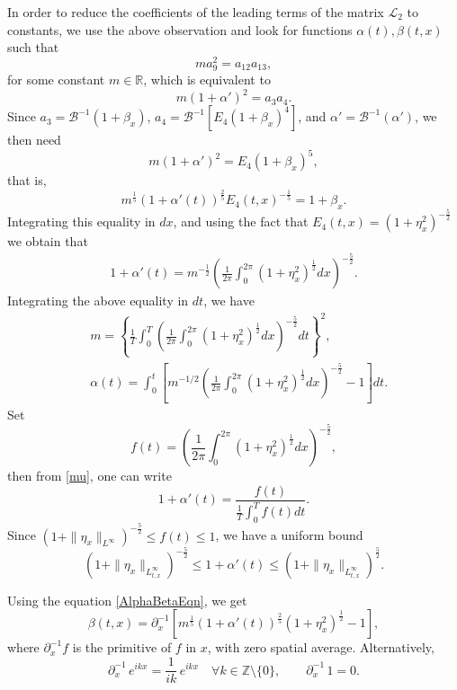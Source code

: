 \documentclass[12pt]{amsart}
\theoremstyle{remark}
\theoremstyle{definition}
\numberwithin{equation}{section}
\newcommand{\p}{\partial}
\newcommand{\R}{\mathbb{R}}
\newcommand{\Z}{\mathbb{Z}}
\newcommand{\al}{\alpha}
\newcommand{\f}{\frac}
\newcommand{\mB}{\mathcal{B}}
\newcommand{\mL}{\mathcal{L}}
\renewcommand{\a}{\alpha}
\newcommand{\inv}{^{-1}}
\begin{document}
In order to reduce the coefficients of the leading terms of the matrix $\mL_2$ to constants, we use the above observation and look for functions $\al(t),\beta(t, x)$ such that
\begin{equation*}
m a^2_9=a_{12}a_{13},
\end{equation*}
for some constant $m\in\R$, which is equivalent to
\begin{equation*}
m(1+\al')^2=a_{3}a_{4}.
\end{equation*}
Since $a_3=\mB\inv(1+\beta_x)$, $a_4=\mB\inv[E_4(1+\beta_x)^4]$, and $\al'=\mathcal{B}^{-1}(\al')$, we then need
\begin{equation*}
m(1+\al')^2=E_4(1+\beta_x)^5,
\end{equation*}
that is, 
\begin{equation} \label{AlphaBetaEqn}
m^{\f15}(1+\al'(t))^{\f25}E_4(t,x)^{-\f15}=1+\beta_x.
\end{equation}
Integrating this equality in $dx$, and using the fact that $E_4(t,x) = (1+\eta_x^2)^{-\f52}$ we obtain that
\begin{align*}
1+\al'(t)=m^{-\f12}\left(\f{1}{2\pi}\int_0^{2\pi}(1+\eta_x^2)^{\f12}dx\right)^{-\f52}.
\end{align*}
Integrating the above equality in $dt$, we have
\begin{align}
&m=\left\{\f{1}{T}\int_0^{T}\left(\f1{2\pi}\int_0^{2\pi}(1+\eta_x^2)^{\f12}dx\right)^{-\f52}dt\right\}^2,  \label{mu} \\
&\a(t) =\int_0^t \left[ m^{-1/2} \left(\f{1}{2\pi}\int_0^{2\pi}(1+\eta_x^2)^{\f12}dx\right)^{-\f52} - 1 \right] dt.\label{alpha}
\end{align}
Set \[f(t)=\left(\f{1}{2\pi}\int_0^{2\pi}(1+\eta_x^2)^{\f12}dx\right)^{-\f52},\]
then from \eqref{mu}, one can write
\[1+\al'(t)=\f{f(t)}{\f1{T}\int_0^Tf(t)dt}.\]
Since $(1+\|\eta_x\|_{L^\infty})^{-\f52}\leq f(t)\leq 1$, we have a uniform bound 
\[
(1+\|\eta_x\|_{L^\infty_{t,x}})^{-\f52} \leq
1+\al'(t)\leq (1+\|\eta_x\|_{L^\infty_{t,x}})^{\f52}.\]

Using the equation \eqref{AlphaBetaEqn}, we get 
\begin{equation} \label{beta}
 \beta(t,x) =  \p_x\inv \left[m^{\f15}(1+\al'(t))^{\f25}(1+\eta_x^2)^{\f12} - 1 \right] , 
\end{equation}
where $\p_x\inv f$ is the primitive of $f$ in $x$, with zero spatial average.
Alternatively,
\[
\p_x\inv \, e^{ikx} = \frac{1}{ik} \, e^{ikx} \quad \forall k \in \Z \setminus \{ 0 \}, 
\qquad 
\p_x\inv \, 1 = 0.
\]
\end{document}

